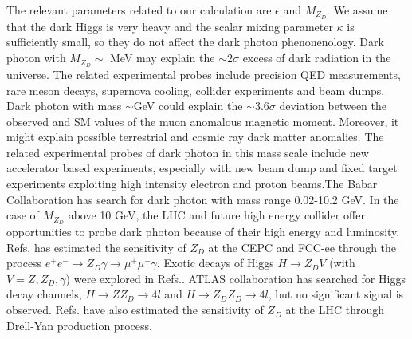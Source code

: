 \documentclass{article}
\begin{document}
 The relevant parameters related to our calculation are $\epsilon$ and $M_{Z_D}$. We assume that the dark Higgs is very heavy and the scalar mixing parameter $\kappa$ is sufficiently small, so they do not affect  the dark photon phenonenology. 
  Dark photon with $M_{Z_D}\sim$ MeV may explain the $\sim 2\sigma$ excess of dark radiation in the universe\cite{2sigma}. The related experimental probes  include precision QED measurements, rare meson decays, supernova cooling, collider experiments and beam dumps\cite{0903.3941,exp,1209.6083}. Dark photon with mass $\sim$GeV   could explain the $\sim 3.6\sigma$ deviation between the observed and SM values of the muon anomalous magnetic moment\cite{gu2}. Moreover, it might explain possible terrestrial and cosmic ray dark matter anomalies\cite{DM}. The related experimental probes of dark photon in this mass scale include new accelerator based experiments\cite{accel-1}, especially with new beam dump and fixed target experiments exploiting high intensity electron \cite{accel-2} and proton beams\cite{accel-3}.The Babar Collaboration has search for dark photon with mass range 0.02-10.2 GeV\cite{Babar}. In the case of $M_{Z_D}$ above 10 GeV, the LHC and future high energy collider offer opportunities to probe dark photon because of their high energy and luminosity.  Refs.\cite{1701.08614} has estimated the sensitivity of $Z_D$ at the CEPC and FCC-ee through the process  $e^+e^-\rightarrow Z_D\gamma \rightarrow \mu^+\mu^-\gamma$.  Exotic decays of Higgs $H\rightarrow Z_DV$ (with $V=Z,Z_D,\gamma$) were explored in Refs.\cite{0801.3456,1405.5196,1405.7691,1408.1075,1312.4992,1603.01377, 1412.0018}. ATLAS collaboration has searched for  Higgs   decay channels, $H\rightarrow ZZ_D\rightarrow 4l$ and $H\rightarrow Z_DZ_D\rightarrow 4l$, but no significant signal is observed\cite{1505.07645}. Refs.\cite{1408.1075,1412.0018} have also estimated the sensitivity of $Z_D$ at the LHC through Drell-Yan production process. 
 
\end{document}
